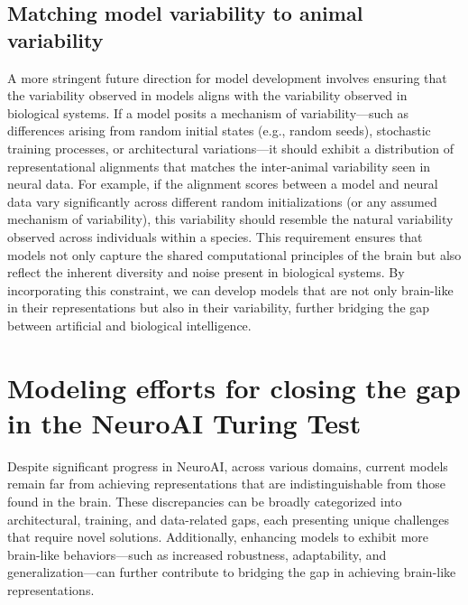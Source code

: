 \subsection{Matching model variability to animal variability}
\label{ss:notions-variability}
A more stringent future direction for model development involves ensuring that the variability observed in models aligns with the variability observed in biological systems. If a model posits a mechanism of variability---such as differences arising from random initial states (e.g., random seeds), stochastic training processes, or architectural variations---it should exhibit a distribution of representational alignments that matches the inter-animal variability seen in neural data. For example, if the alignment scores between a model and neural data vary significantly across different random initializations (or any assumed mechanism of variability), this variability should resemble the natural variability observed across individuals within a species. This requirement ensures that models not only capture the shared computational principles of the brain but also reflect the inherent diversity and noise present in biological systems. By incorporating this constraint, we can develop models that are not only brain-like in their representations but also in their variability, further bridging the gap between artificial and biological intelligence.


\section{Modeling efforts for closing the gap in the NeuroAI Turing Test}
\label{ss:notions-gap}
Despite significant progress in NeuroAI, across various domains, current models remain far from achieving representations that are indistinguishable from those found in the brain. These discrepancies can be broadly categorized into architectural, training, and data-related gaps, each presenting unique challenges that require novel solutions. Additionally, enhancing models to exhibit more brain-like behaviors---such as increased robustness, adaptability, and generalization---can further contribute to bridging the gap in achieving brain-like representations.
